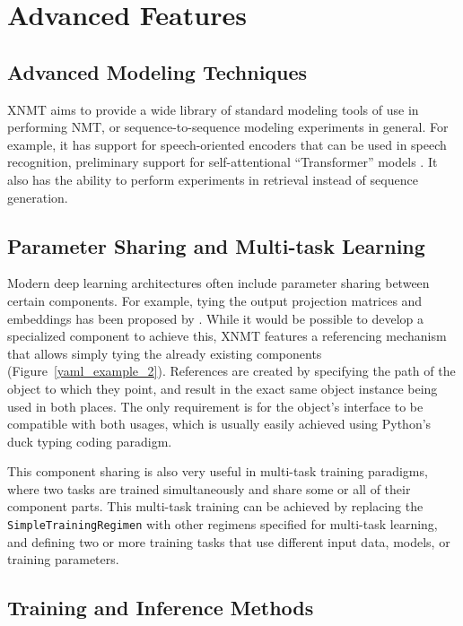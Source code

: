 \documentclass[]{article}
\begin{document}
\section{Advanced Features}

\subsection{Advanced Modeling Techniques}

XNMT aims to provide a wide library of standard modeling tools of use in performing NMT, or sequence-to-sequence modeling experiments in general.
For example, it has support for speech-oriented encoders \citep{chan2016listen,harwath2016unsupervised} that can be used in speech recognition, preliminary support for self-attentional ``Transformer'' models \citep{vaswani2017attention}.
It also has the ability to perform experiments in retrieval \citep{huang2013learning} instead of sequence generation.

\subsection{Parameter Sharing and Multi-task Learning}

Modern deep learning architectures often include parameter sharing between certain components. For example, tying the output projection matrices and embeddings has been proposed by \citet{press2016using}. While it would be possible to develop a specialized component to achieve this, XNMT features a referencing mechanism that allows simply tying the already existing components (Figure~\ref{yaml_example_2}). References are created by specifying the path of the object to which they point, and result in the exact same object instance being used in both places. The only requirement is for the object's interface to be compatible with both usages, which is usually easily achieved using Python's duck typing coding paradigm. 

This component sharing is also very useful in multi-task training paradigms, where two tasks are trained simultaneously and share some or all of their component parts.
This multi-task training can be achieved by replacing the \texttt{SimpleTrainingRegimen} with other regimens specified for multi-task learning, and defining two or more training tasks that use different input data, models, or training parameters.

\subsection{Training and Inference Methods}
\end{document}
